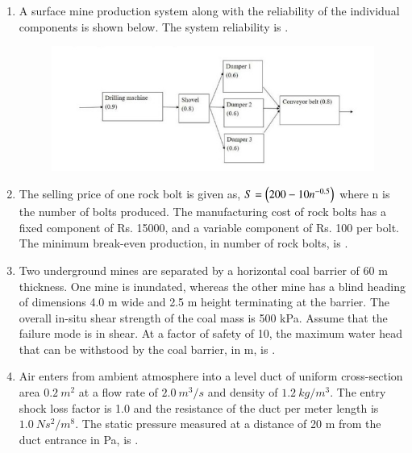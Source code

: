 \documentclass[journal,12pt,onecolumn]{IEEEtran}
\theoremstyle{remark}
\begin{document}
\begin{enumerate}
\item A surface mine production system along with the reliability of the individual components is shown below. The system reliability is \underline{\hspace{2cm}} .

\hfill{}

\begin{figure}[H]
\centering
\includegraphics[width=0.9\columnwidth]{figs/2020mn34.jpeg}
\caption*{}
\label{fig:q34}
\end{figure}

\item The selling price of one rock bolt  is given as, $S=\brak{200-10n^{-0.5}}$ where n is the number of bolts produced. The manufacturing cost of rock bolts has a fixed component of Rs. 15000, and a variable component of Rs. 100 per bolt. The minimum break-even production, in number of rock bolts, is \underline{\hspace{2cm}} .

\hfill{}

\item Two underground mines are separated by a horizontal coal barrier of 60 m thickness. One mine is inundated, whereas the other mine has a blind heading of dimensions 4.0 m wide and 2.5 m height terminating at the barrier. The overall in-situ shear strength of the coal mass is 500 kPa. Assume that the failure mode is in shear. At a factor of safety of 10, the maximum water head that can be withstood by the coal barrier, in m, is \underline{\hspace{2cm}} .

\hfill{}

\item Air enters from ambient atmosphere into a level duct of uniform cross-section area $0.2~m^{2}$ at a flow rate of $2.0~m^{3}/s$ and density of $1.2~kg/m^{3}$. The entry shock loss factor is 1.0 and the resistance of the duct per meter length is $1.0~Ns^{2}/m^{8}$. The static pressure measured at a distance of 20 m from the duct entrance in Pa, is \underline{\hspace{2cm}} .


\end{enumerate}
\end{document}
